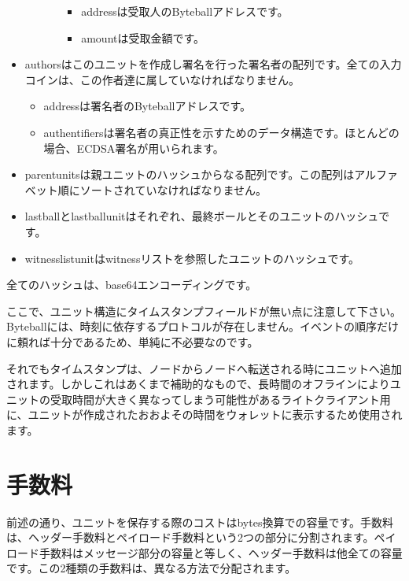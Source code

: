 \documentclass[a4paper, dvipdfmx]{jsarticle}
\begin{document}
\begin{itemize}
\begin{itemize}
\begin{itemize}
            \begin{itemize}
                \item addressは受取人のByteballアドレスです。
                \item amountは受取金額です。
            \end{itemize}
        \end{itemize}
    \end{itemize}
    \item authorsはこのユニットを作成し署名を行った署名者の配列です。全ての入力コインは、この作者達に属していなければなりません。
    \begin{itemize}
        \item addressは署名者のByteballアドレスです。
        \item authentifiersは署名者の真正性を示すためのデータ構造です。ほとんどの場合、ECDSA署名が用いられます。
    \end{itemize}
    \item parent\textunderscore unitsは親ユニットのハッシュからなる配列です。この配列はアルファベット順にソートされていなければなりません。
    \item last\textunderscore ballとlast\textunderscore ball\textunderscore unitはそれぞれ、最終ボールとそのユニットのハッシュです。
    \item witness\textunderscore list\textunderscore unitはwitnessリストを参照したユニットのハッシュです。
\end{itemize}

\noindent 全てのハッシュは、base64エンコーディングです。

ここで、ユニット構造にタイムスタンプフィールドが無い点に注意して下さい。Byteballには、時刻に依存するプロトコルが存在しません。イベントの順序だけに頼れば十分であるため、単純に不必要なのです。

それでもタイムスタンプは、ノードからノードへ転送される時にユニットへ追加されます。しかしこれはあくまで補助的なもので、長時間のオフラインによりユニットの受取時間が大きく異なってしまう可能性があるライトクライアント用に、ユニットが作成されたおおよその時間をウォレットに表示するため使用されます。


\section{手数料}
前述の通り、ユニットを保存する際のコストはbytes換算での容量です。手数料は、ヘッダー手数料とペイロード手数料という2つの部分に分割されます。ペイロード手数料はメッセージ部分の容量と等しく、ヘッダー手数料は他全ての容量です。この2種類の手数料は、異なる方法で分配されます。
\end{document}
